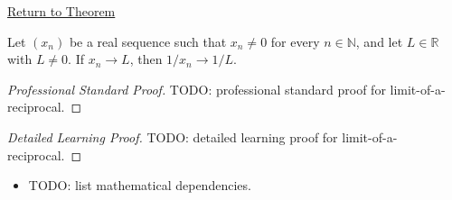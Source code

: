 \newpage
{}
\label{prf:limit-of-a-reciprocal}

\begin{remark*}[Return]
\hyperref[thm:limit-of-a-reciprocal]{Return to Theorem}
\end{remark*}

\begin{theorem*}
Let $(x_n)$ be a real sequence such that $x_n\neq 0$ for every
$n\in\mathbb{N}$, and let $L\in\mathbb{R}$ with $L\neq 0$. If $x_n\to L$,
then $1/x_n\to 1/L$.

\smallskip
\noindent
\end{theorem*}

\begin{proof}[Professional Standard Proof]
\LRAProofBodyStart
TODO: professional standard proof for limit-of-a-reciprocal.
\end{proof}

\begin{proof}[Detailed Learning Proof]
\LRAProofBodyStart
TODO: detailed learning proof for limit-of-a-reciprocal.
\end{proof}

\begin{remark*}
\end{remark*}

\begin{dependencies}
\begin{itemize}
  \item TODO: list mathematical dependencies.
\end{itemize}
\end{dependencies}

\clearpage
